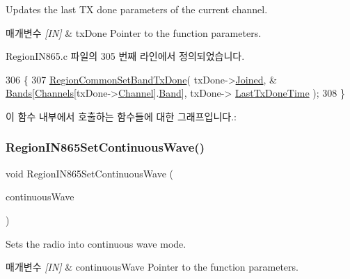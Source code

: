 Updates the last TX done parameters of the current channel. 


\begin{DoxyParams}{매개변수}
{\em \mbox{[}\+I\+N\mbox{]}} & tx\+Done Pointer to the function parameters. \\
\hline
\end{DoxyParams}


Region\+I\+N865.\+c 파일의 305 번째 라인에서 정의되었습니다.


\begin{DoxyCode}
306 \{
307     \mbox{\hyperlink{group___r_e_g_i_o_n_c_o_m_m_o_n_ga491dea5590228a0cd33affd71743779c}{RegionCommonSetBandTxDone}}( txDone->\mbox{\hyperlink{structs_set_band_tx_done_params_ac2f6caa0f3b02d2ac5056c3ee7c22652}{Joined}}, &
      \mbox{\hyperlink{_region_i_n865_8c_a9250eb5b8133c0d3c631dee6283deb17}{Bands}}[\mbox{\hyperlink{_region_i_n865_8c_adad6dcb99199b5142166021a8aac9aa2}{Channels}}[txDone->\mbox{\hyperlink{structs_set_band_tx_done_params_a1ca6f01ca18afe402de51babe8c95f5e}{Channel}}].\mbox{\hyperlink{structs_channel_params_a724c03aa06953111c3291243831f251b}{Band}}], txDone->
      \mbox{\hyperlink{structs_set_band_tx_done_params_a7316dfb002c4e0015fceeb727020fe5c}{LastTxDoneTime}} );
308 \}
\end{DoxyCode}
이 함수 내부에서 호출하는 함수들에 대한 그래프입니다.\+:
\mbox{\label{group___r_e_g_i_o_n_i_n865_gaf8fbc63e4fc4b21a4c69755c1750f194}} 
\subsubsection{\texorpdfstring{Region\+I\+N865\+Set\+Continuous\+Wave()}{RegionIN865SetContinuousWave()}}
{\footnotesize\ttfamily void Region\+I\+N865\+Set\+Continuous\+Wave (\begin{DoxyParamCaption}\item[{\mbox{\hyperlink{group___r_e_g_i_o_n_gaf39bb5ba06921139c6d17f88a8d518cd}{Continuous\+Wave\+Params\+\_\+t}} $\ast$}]{continuous\+Wave }\end{DoxyParamCaption})}



Sets the radio into continuous wave mode. 


\begin{DoxyParams}{매개변수}
{\em \mbox{[}\+I\+N\mbox{]}} & continuous\+Wave Pointer to the function parameters. \\
\hline
\end{DoxyParams}


